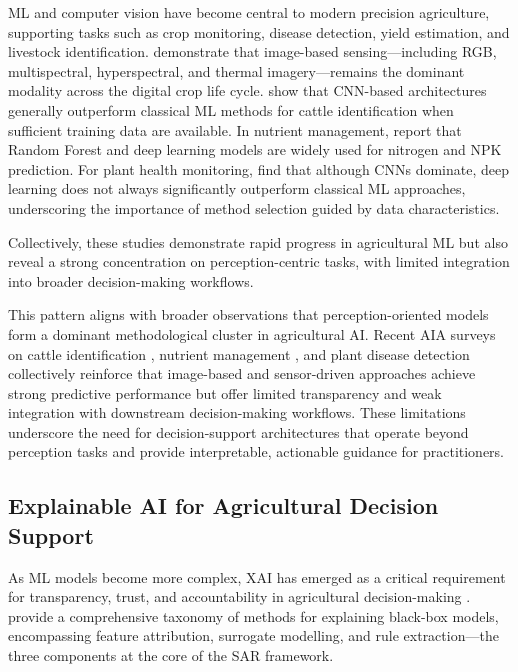 \documentclass[3p,twocolumn,authoryear]{elsarticle}
\begin{document}
ML and computer vision have become central to modern precision
agriculture, supporting tasks such as crop monitoring, disease detection,
yield estimation, and livestock identification.
\citet{ghazal2024survey} demonstrate that image-based sensing---including
RGB, multispectral, hyperspectral, and thermal imagery---remains the
dominant modality across the digital crop life cycle.
\citet{hossain2022cattle} show that CNN-based architectures generally
outperform classical ML methods for cattle identification when sufficient
training data are available.
In nutrient management, \citet{ennaji2023nutrient} report that Random
Forest and deep learning models are widely used for nitrogen and NPK
prediction.
For plant health monitoring, \citet{omaye2024disease} find that although
CNNs dominate, deep learning does not always significantly outperform
classical ML approaches, underscoring the importance of method selection
guided by data characteristics.

Collectively, these studies demonstrate rapid progress in agricultural ML
but also reveal a strong concentration on perception-centric tasks, with
limited integration into broader decision-making workflows.

This pattern aligns with broader observations that perception-oriented
models form a dominant methodological cluster in agricultural AI.
Recent AIA surveys on cattle identification \citep{hossain2022cattle},
nutrient management \citep{ennaji2023nutrient}, and plant disease
detection \citep{omaye2024disease} collectively reinforce that
image-based and sensor-driven approaches achieve strong predictive
performance but offer limited transparency and weak integration with
downstream decision-making workflows. These limitations underscore the
need for decision-support architectures that operate beyond perception
tasks and provide interpretable, actionable guidance for practitioners.


\subsection{Explainable AI for Agricultural Decision Support}

As ML models become more complex, XAI has emerged as a critical
requirement for transparency, trust, and accountability in agricultural
decision-making \citep{arrieta2020,linardatos2021}.
\citet{guidotti2019} provide a comprehensive taxonomy of methods for
explaining black-box models, encompassing feature attribution, surrogate
modelling, and rule extraction---the three components at the core of the
SAR framework.
\end{document}
